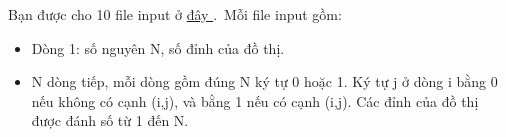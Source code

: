 Bạn được cho 10 file input ở \href{https://www.dropbox.com/s/rsc403hk54lye08/VMCOUNT.zip?dl=0}{ đây } . Mỗi file input gồm:
\begin{itemize}
	\item Dòng 1: số nguyên N, số đỉnh của đồ thị.
	\item N dòng tiếp, mỗi dòng gồm đúng N ký tự 0 hoặc 1. Ký tự j ở dòng i bằng 0 nếu không có cạnh (i,j), và bằng 1 nếu có cạnh (i,j). Các đỉnh của đồ thị được đánh số từ 1 đến N.
\end{itemize}